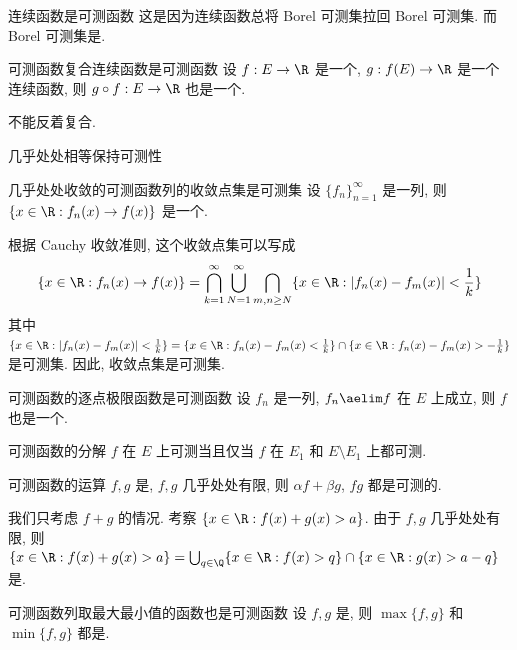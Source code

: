\begin{ppt}
    {连续函数是可测函数}
    这是因为连续函数总将 Borel 可测集拉回 Borel 可测集. 而 Borel 可测集是\MeasurableSet{}.
\end{ppt}
\begin{ppt}
    {可测函数复合连续函数是可测函数}
    设 \(f:E\to\R\) 是一个\MeasurableFunc{}, \(g:f(E)\to\R\) 是一个连续函数, 则 \(g\circ f:E\to\R\) 也是一个\MeasurableFunc{}.
\end{ppt}
\begin{rmk}
    不能反着复合.
\end{rmk}
\begin{ppt}
    {几乎处处相等保持可测性}
\end{ppt}
\begin{ppt}
    {几乎处处收敛的可测函数列的收敛点集是可测集}
    设 \(\{f_n\}_{n=1}^\infty\) 是一列\MeasurableFunc{}, 则 \(\{x\in\R: f_n(x)\to f(x)\}\) 是一个\MeasurableSet{}.
\end{ppt}
\begin{prf}
    根据 Cauchy 收敛准则, 这个收敛点集可以写成
    \[\{x\in\R: f_n(x)\to f(x)\}=\bigcap_{k=1}^\infty \bigcup_{N=1}^\infty \bigcap_{m,n\geq N} \{x\in\R: |f_n(x)-f_m(x)|<\frac{1}{k}\}\]
    其中 \(\{x\in\R: |f_n(x)-f_m(x)|<\frac{1}{k}\}=\{x\in\R: f_n(x)-f_m(x)<\frac{1}{k}\}\cap \{x\in\R: f_n(x)-f_m(x)>-\frac{1}{k}\}\) 是可测集. 因此, 收敛点集是可测集.
\end{prf}
\begin{crl}
    {可测函数的逐点极限函数是可测函数}
    设 \(f_n\) 是一列\MeasurableFunc{}, \(f_n\aelim f\) 在 \(E\) 上成立, 则 \(f\) 也是一个\MeasurableFunc{}.
\end{crl}
\begin{ppt}
    {可测函数的分解}
    \(f\) 在 \(E\) 上可测当且仅当 \(f\) 在 \(E_1\) 和 \(E\setminus E_1\) 上都可测.
\end{ppt}
\begin{ppt}
    {可测函数的运算}
    \(f,g\) 是\MeasurableFunc{}, \(f,g\) 几乎处处有限, 则 \(\alpha f+\beta g\), \(fg\) 都是可测的.
\end{ppt}
\begin{prf}
    我们只考虑 \(f+g\) 的情况. 考察 \(\{x\in\R: f(x)+g(x)>a\}\). 由于 \(f,g\) 几乎处处有限, 则 \(\{x\in\R: f(x)+g(x)>a\}=\bigcup_{q\in\Q} \{x\in\R: f(x)>q\}\cap \{x\in\R: g(x)>a-q\}\) 是\MeasurableSet{}.
\end{prf}
\begin{ppt}
    {可测函数列取最大最小值的函数也是可测函数}
    设 \(f,g\) 是\MeasurableFunc{}, 则 \(\max\{f,g\}\) 和 \(\min\{f,g\}\) 都是\MeasurableFunc{}.
\end{ppt}

